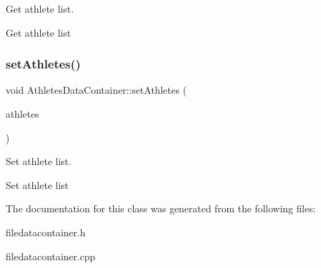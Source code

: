 Get athlete list. 

Get athlete list \mbox{\label{classAthletesDataContainer_a995bd1c1985906ab41b0c6c19937cb3c}} 
\subsubsection{\texorpdfstring{setAthletes()}{setAthletes()}}
{\footnotesize\ttfamily void Athletes\+Data\+Container\+::set\+Athletes (\begin{DoxyParamCaption}\item[{std\+::vector$<$ \mbox{\hyperlink{classAthleteDataContainer}{Athlete\+Data\+Container}} $>$}]{athletes }\end{DoxyParamCaption})}



Set athlete list. 

Set athlete list 

The documentation for this class was generated from the following files\+:\begin{DoxyCompactItemize}
\item 
filedatacontainer.\+h\item 
filedatacontainer.\+cpp\end{DoxyCompactItemize}
